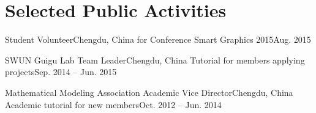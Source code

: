 \section{\textbf{Selected Public Activities}}
  \resumeSubHeadingListStart

    \resumeSubheading
        {Student Volunteer}{Chengdu, China}
        {for Conference Smart Graphics 2015}{Aug. 2015}

    \resumeSubheading
        {SWUN Guigu Lab Team Leader}{Chengdu, China}
        {Tutorial for members applying projects}{Sep. 2014 -- Jun. 2015}

    \resumeSubheading
        {Mathematical Modeling Association Academic Vice Director}{Chengdu, China}
        {Academic tutorial for new members}{Oct. 2012 -- Jun. 2014}

  \resumeSubHeadingListEnd